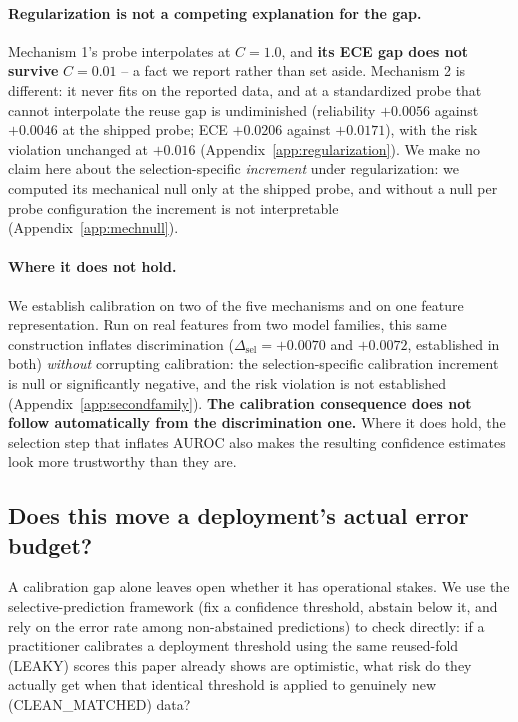 \documentclass{article}
\begin{document}
\paragraph{Regularization is not a competing explanation for the gap.}
Mechanism 1's probe interpolates at $C{=}1.0$, and \textbf{its ECE gap does not
survive} $C{=}0.01$ -- a fact we report rather than set aside. Mechanism 2 is
different: it never fits on the reported data, and at a standardized probe that
cannot interpolate the reuse gap is undiminished (reliability $+0.0056$ against
$+0.0046$ at the shipped probe; ECE $+0.0206$ against $+0.0171$), with the risk
violation unchanged at $+0.016$
(Appendix~\ref{app:regularization}). We make no claim here about the
selection-specific \emph{increment} under regularization: we computed its
mechanical null only at the shipped probe, and without a null per probe
configuration the increment is not interpretable
(Appendix~\ref{app:mechnull}).

\paragraph{Where it does not hold.} We establish calibration on two of the five
mechanisms and on one feature representation. Run on real features from two
model families, this same construction inflates discrimination
($\Delta_{\text{sel}}=+0.0070$ and $+0.0072$, established in both)
\emph{without} corrupting calibration: the selection-specific calibration
increment is null or significantly negative, and the risk violation is not
established (Appendix~\ref{app:secondfamily}). \textbf{The calibration
consequence does not follow automatically from the discrimination one.} Where
it does hold, the selection step that inflates AUROC also makes the resulting
confidence estimates look more trustworthy than they are.

\subsection{Does this move a deployment's actual error budget?}
\label{sec:selective-prediction}

A calibration gap alone leaves open whether it has operational stakes. We
use the selective-prediction framework (fix a confidence threshold, abstain
below it, and rely on the error rate among non-abstained predictions) to
check directly: if a practitioner calibrates a deployment threshold using
the same reused-fold (LEAKY) scores this paper already shows are optimistic,
what risk do they actually get when that identical threshold is applied to
genuinely new (CLEAN\_MATCHED) data?
\end{document}
